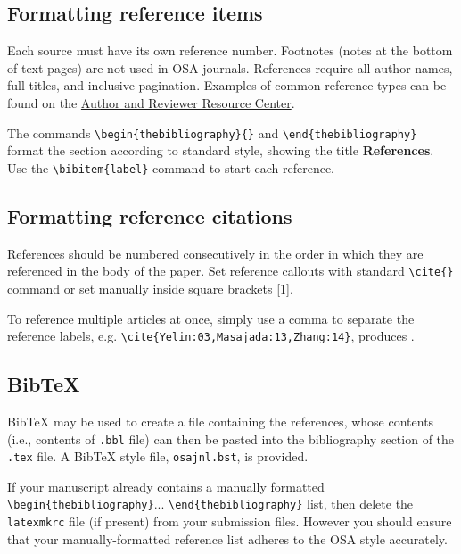 \documentclass{osa-article}
\begin{document}
\subsection{Formatting reference items}
Each source must have its own reference number. Footnotes (notes at the bottom of text pages) are not used in OSA journals. References require all author names, full titles, and inclusive pagination. Examples of common reference types can be found on the  \href{http://www.osapublishing.org/submit/style/style_traditional_journals.cfm} {Author and Reviewer Resource Center}.


The commands \verb+\begin{thebibliography}{}+ and \verb+\end{thebibliography}+ format the section according to standard style, showing the title {\bfseries References}.  Use the \verb+\bibitem{label}+ command to start each reference.

\subsection{Formatting reference citations}
References should be numbered consecutively in the order in which they are referenced in the body of the paper. Set reference callouts with standard \verb+\cite{}+ command or set manually inside square brackets [1].

To reference multiple articles at once, simply use a comma to separate the reference labels, e.g. \verb+\cite{Yelin:03,Masajada:13,Zhang:14}+, produces \cite{Yelin:03,Masajada:13,Zhang:14}.

\subsection{Bib\TeX}
\label{sec:bibtex}
Bib\TeX{} may be used to create a file containing the references, whose contents (i.e., contents of \texttt{.bbl} file) can then be pasted into the bibliography section of the \texttt{.tex} file. A Bib\TeX{} style file, \texttt{osajnl.bst}, is provided.

If your manuscript already contains a manually formatted \verb|\begin{thebibliography}|... \verb|\end{thebibliography}| list, then delete the \texttt{latexmkrc} file (if present) from your submission files. However you should ensure that your manually-formatted reference list adheres to the OSA style accurately.
\end{document}
